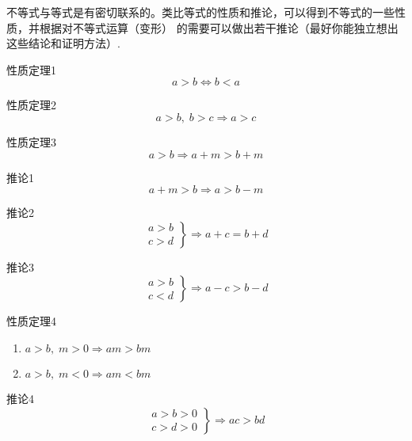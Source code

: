 不等式与等式是有密切联系的。类比等式的性质和推论，可以得到不等式的一些性质，并根据对不等式运算（变形）
的需要可以做出若干推论（最好你能独立想出这些结论和证明方法）.

\begin{thm}{性质定理1}
    \[a>b\Longleftrightarrow b<a\]
\end{thm}

\begin{thm}{性质定理2}
    \begin{equation}
        a>b,\; b>c \Longrightarrow a>c \tag{传递性}
    \end{equation}
\end{thm}

\begin{thm}{性质定理3}
    \[a>b\Longrightarrow a+m>b+m\]
\end{thm}


\begin{thm}{推论1}
    \[a+m>b\Longrightarrow a>b-m\]
\end{thm}

\begin{thm}{推论2}
    \[\left.\begin{array}{c}
        a>b\\
        c>d
    \end{array}\right\} \Longrightarrow a+c=b+d\]    
\end{thm}

\begin{thm}{推论3}
    \[\left.\begin{array}{c}
        a>b\\
        c<d
    \end{array}\right\} \Longrightarrow a-c>b-d\]    
\end{thm}


\begin{thm}{性质定理4}
\begin{enumerate}
    \item $a>b,\; m>0\Longrightarrow am>bm$
    \item $a>b,\; m<0\Longrightarrow am<bm$
\end{enumerate}
\end{thm}

\begin{thm}{推论4}
    \[\left.\begin{array}{c}
        a>b>0\\
        c>d>0
    \end{array}\right\} \Longrightarrow ac>bd\]    
\end{thm}

